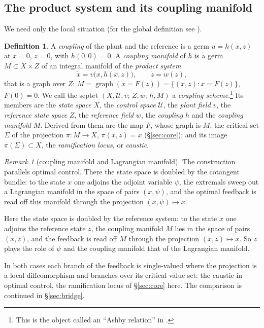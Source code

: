\documentclass[11pt,reqno]{amsart}
\theoremstyle{plain}
\theoremstyle{definition}
\newtheorem*{definition}{Definition}
\theoremstyle{remark}
\newtheorem*{remark}{Remark}
\DeclareMathOperator{\graph}{graph}
\newcommand{\Sig}{\Sigma}
\begin{document}
\subsection{The product system and its coupling manifold}\label{sec:product}
We need only the local situation (for the global definition see \cite[\S2]{Shosh1990}).
\begin{definition}\label{def:coupling}
A \emph{coupling} of the plant and the reference is a germ $u=h(x,z)$ at $x=0$, $z=0$, with $h(0,0)=0$.
A \emph{coupling manifold} of $h$ is a germ $M\subset X\times Z$ of an integral manifold of the
\emph{product system}
\[
  \dot x=v\bigl(x,h(x,z)\bigr),\qquad \dot z=w(z),
\]
that is a graph over $Z$: $M=\graph(x=F(z))=\{(x,z):x=F(z)\}$, $F(0)=0$. We call the septet $(X,\mathcal U,v;\,Z,w;\,h,M)$ a \emph{coupling scheme}.\footnote{This is the object called an ``Ashby relation'' in \cite{Shosh1990}.}
Its members are the \emph{state space} $X$, the \emph{control space} $\mathcal U$, the \emph{plant field} $v$, the
\emph{reference state space} $Z$, the \emph{reference field} $w$, the \emph{coupling} $h$ and the \emph{coupling
manifold} $M$. Derived from them are the map $F$, whose graph is $M$; the critical set $\Sig$ of the projection
$\pi\colon M\to X$, $\pi(x,z)=x$ (\S\ref{sec:core}); and its image $\pi(\Sig)\subset X$, the \emph{ramification
locus}, or \emph{caustic}.
\end{definition}

\begin{remark}[coupling manifold and Lagrangian manifold]\label{rem:lagrange}
The construction parallels optimal control. There the state space is doubled by the cotangent bundle:
to the state $x$ one adjoins the adjoint variable $\psi$, the extremals sweep out a Lagrangian manifold
in the space of pairs $(x,\psi)$, and the optimal feedback is read off this manifold through the
projection $(x,\psi)\mapsto x$.

Here the state space is doubled by the reference system: to the state $x$
one adjoins the reference state $z$, the coupling manifold $M$ lies in the space of pairs $(x,z)$, and
the feedback is read off $M$ through the projection $(x,z)\mapsto x$. So $z$ plays the role of $\psi$ and
the coupling manifold that of the Lagrangian manifold.

In both cases each branch of the feedback is single-valued where
the projection is a local diffeomorphism and branches over its critical value set: the caustic in
optimal control, the ramification locus of \S\ref{sec:core} here. The comparison is continued in
\S\ref{sec:bridge}.
\end{remark}
\end{document}
